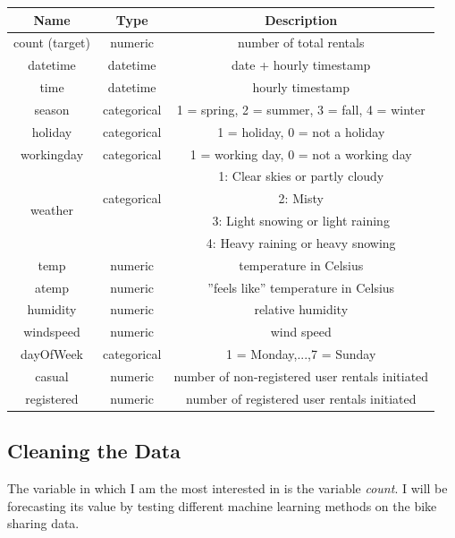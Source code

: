 \documentclass[12pt]{article}
\begin{document}
	\begin{center}
		\begin{tabular}{ |c|c|c| } 
			\hline
			\textbf{Name} & \textbf{Type} & \textbf{Description} \\ 
			\hline
			\hline
			count (target) & numeric & number of total rentals \\ 
			\hline
			datetime & datetime & date + hourly timestamp \\
			\hline 
			time & datetime & hourly timestamp \\ 
			\hline
			season & categorical & 1 = spring, 2 = summer, 3 = fall, 4 = winter  \\ 
			\hline
			holiday & categorical & 1 = holiday, 0 = not a holiday \\ 
			\hline
			workingday & categorical & 1 = working day, 0 = not a working day \\ 
			\hline
			\multirow{4}{4em}{weather} &  & 1: Clear skies or partly cloudy \\ 
			& categorical & 2: Misty \\ 
			&  & 3: Light snowing or light raining \\ 
			&  & 4: Heavy raining or heavy snowing  \\ 
			\hline
			temp & numeric & temperature in Celsius \\ 
			\hline
			atemp & numeric & ''feels like'' temperature in Celsius \\ 
			\hline
			humidity & numeric &  relative humidity \\ 
			\hline
			windspeed & numeric &  wind speed \\ 
			\hline
			dayOfWeek & categorical &  1 = Monday,...,7 = Sunday\\ 
			\hline
			casual & numeric & number of non-registered user rentals initiated \\ 
			\hline
			registered & numeric &  number of registered user rentals initiated \\ 
			\hline
			
		\end{tabular}
	\end{center}
	
	\subsection{Cleaning the Data}
	The variable in which I am the most interested in is the variable \textit{count}. I will be forecasting its value by testing different machine learning methods on the bike sharing data.
	
\end{document}
